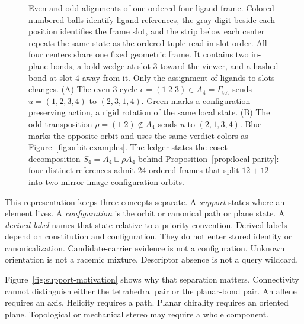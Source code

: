 \documentclass[pdflatex,sn-mathphys-num,referee,lineno]{sn-jnl}
\theoremstyle{plain}
\theoremstyle{remark}
\theoremstyle{definition}
\begin{document}
\begin{figure}[htbp]
  \centering
  \resizebox{\textwidth}{!}{}
  \caption{Even and odd alignments of one ordered four-ligand frame.  Colored
  numbered balls identify ligand references, the gray digit beside each
  position identifies the frame slot, and the strip below each center repeats
  the same state as the ordered tuple read in slot order.  All four centers
  share one fixed geometric frame.  It contains two in-plane bonds, a bold
  wedge at slot 3 toward the viewer, and a hashed bond at slot 4 away from it.
  Only the assignment of ligands to slots changes.
  (A) The even 3-cycle \(\epsilon=(1\;2\;3)\in A_4=\Gamma_{\mathrm{tet}}\)
  sends \(u=(1,2,3,4)\) to \((2,3,1,4)\).  Green marks a
  configuration-preserving action, a rigid rotation of the same local state.
  (B) The odd transposition \(\rho=(1\;2)\notin A_4\) sends \(u\) to
  \((2,1,3,4)\).  Blue marks the opposite orbit and uses the same verdict colors
  as Figure~\ref{fig:orbit-examples}.  The ledger states the coset
  decomposition \(S_4=A_4\sqcup\rho A_4\) behind
  Proposition~\ref{prop:local-parity}: four distinct references admit 24
  ordered frames that split \(12+12\) into two mirror-image configuration
  orbits.}
  \label{fig:ball-permutation}
\end{figure}

This representation keeps three concepts separate.  A \emph{support} states
where an element lives.  A \emph{configuration} is the orbit or canonical
path or plane state.  A \emph{derived label} names that state relative to a
priority convention.  Derived labels depend on constitution and configuration.
They do not enter stored identity or canonicalization.  Candidate-carrier
evidence is not a configuration.
Unknown orientation is not a racemic mixture.  Descriptor absence is not a
query wildcard.

Figure~\ref{fig:support-motivation} shows why that separation matters.
Connectivity cannot distinguish either the tetrahedral pair or the planar-bond
pair.  An allene requires an axis.  Helicity requires a path.  Planar chirality
requires an oriented plane.  Topological or mechanical stereo may require a
whole component.
\end{document}
